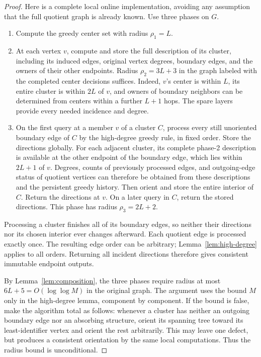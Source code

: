 \documentclass[11pt]{article}
\theoremstyle{definition}
\begin{document}
\begin{proof}
Here is a complete local online implementation, avoiding any assumption
that the full quotient graph is already known. Use three phases on $G$.
\begin{enumerate}
\item Compute the greedy center set with radius $\rho_1=L$.
\item At each vertex $v$, compute and store the full description of its
cluster, including its induced edges, original vertex degrees, boundary
edges, and the owners of their other endpoints. Radius $\rho_2=3L+3$
in the graph labeled with the completed center decisions suffices.
Indeed, $v$'s center is within $L$, its entire cluster is within $2L$
of $v$, and owners of boundary neighbors can be determined from centers
within a further $L+1$ hops. The spare layers provide every needed
incidence and degree.
\item On the first query at a member $v$ of a cluster $C$, process every
still unoriented boundary edge of $C$ by the high-degree greedy rule, in
fixed order. Store the directions globally. For each adjacent cluster,
its complete phase-2 description is available at the other endpoint of
the boundary edge, which lies within $2L+1$ of $v$. Degrees, counts of
previously processed edges, and outgoing-edge status of quotient vertices
can therefore be obtained from these descriptions and the persistent
greedy history. Then orient and store the entire interior of $C$.
Return the directions at $v$. On a later query in $C$, return the stored
directions. This phase has radius $\rho_3=2L+2$.
\end{enumerate}
Processing a cluster finishes all of its boundary edges, so neither their
directions nor its chosen interior ever changes afterward. Each quotient
edge is processed exactly once. The resulting edge order can be arbitrary;
Lemma~\ref{lem:high-degree} applies to all orders. Returning all incident
directions therefore gives consistent immutable endpoint outputs.

By Lemma~\ref{lem:composition}, the three phases require radius at most
$6L+5=O(\log\log M)$ in the original graph. The argument uses the bound
$M$ only in the high-degree lemma, component by component. If the bound is
false, make the algorithm total as follows: whenever a cluster has neither
an outgoing boundary edge nor an absorbing structure, orient its spanning
tree toward its least-identifier vertex and orient the rest arbitrarily.
This may leave one defect, but produces a consistent orientation by the
same local computations. Thus the radius bound is unconditional.
\end{proof}
\end{document}
